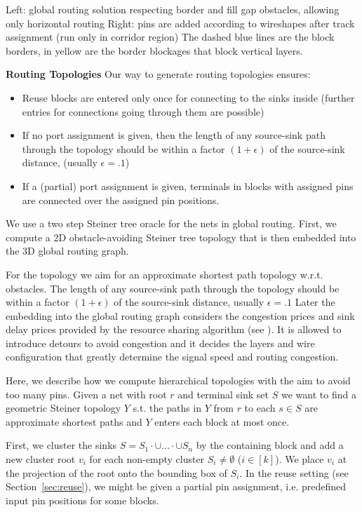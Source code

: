 \documentclass[a2paper]{bigsposter}
\begin{document}
\begin{blockrow}[3]
\begin{tikzpicture}[yscale=0.7]
 		\end{tikzpicture} 
 {\footnotesize \begin{spacing}{0.9}
 		Left: global routing solution respecting border and fill gap obstacles, allowing only horizontal routing
 		Right: pins are added according to wireshapes after track assignment (run only in corridor region)
 		The dashed blue lines are the block borders, in yellow are the border blockages that block vertical layers.
 	\end{spacing}	}
 
 	
	\blockbreak
	\textbf{Routing Topologies}
	Our way to generate routing topologies ensures:
	\begin{itemize}
		\item Reuse blocks are entered only once for connecting to the sinks inside (further entries for connections going through them are possible)
		\item If no port assignment is given, then the length of any source-sink path through the topology
		should be within a factor $(1+\epsilon)$ of the source-sink distance, (usually $\epsilon=.1$)
		\item If a (partial) port assignment is given, terminals in blocks with assigned pins are connected over the assigned pin positions.
	\end{itemize}
	We use a two step Steiner tree oracle for the nets in  global routing.
	First, we compute a 2D obstacle-avoiding Steiner tree topology  that is then embedded into the 3D global routing graph.
	
	
	For the topology  we aim  for an approximate shortest path topology w.r.t. obstacles. The length of any source-sink path through the topology
	should be within a factor $(1+\epsilon)$ of the source-sink distance, usually $\epsilon=.1$ 
	Later the embedding into the global routing graph considers the congestion prices and sink delay prices provided by the resource sharing algorithm (see \cite{BRGTiming2}).
	It is allowed to  introduce detours to avoid congestion and it decides the  layers and wire configuration that greatly determine the signal speed and routing congestion.
	
	Here, we describe how we compute hierarchical topologies with the aim to avoid too many pins.
	Given  a net with root $r$ and terminal sink set $S$ we want to find a geometric Steiner topology $Y$ s.t.
	the paths in $Y$ from $r$ to each $s\in S$  are  approximate shortest paths and $Y$ enters each block at most once.
	
	First, we cluster the sinks $S = S_1\cdot{\cup}\dots\cdot{\cup} S_n$ by the containing block and add a new cluster root $v_i$ for each non-empty cluster $S_i \neq\emptyset$ ($i\in [k]$).
	We place  $v_i$ at  the projection of the root onto the bounding box of $S_i$. 
	In the reuse setting (see Section~\ref{sec:reuse}), we might be given a partial pin assignment, i.e. predefined input pin positions for some blocks. %
	

\end{blockrow}
\end{document}
